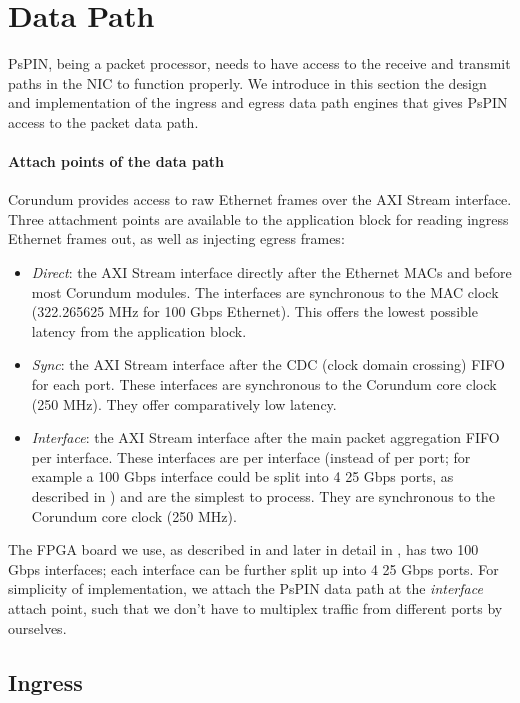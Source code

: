 \section{Data Path}

PsPIN, being a packet processor, needs to have access to the receive and transmit paths in the NIC to function properly.  We introduce in this section the design and implementation of the ingress and egress data path engines that gives PsPIN access to the packet data path.

\paragraph{Attach points of the data path} Corundum provides access to raw Ethernet frames over the AXI Stream interface.  Three attachment points are available to the application block for reading ingress Ethernet frames out, as well as injecting egress frames:

\begin{itemize}
    \item \emph{Direct}: the AXI Stream interface directly after the Ethernet MACs and before most Corundum modules.  The interfaces are synchronous to the MAC clock (322.265625 MHz for 100 Gbps Ethernet).  This offers the lowest possible latency from the application block.
    \item \emph{Sync}: the AXI Stream interface after the CDC (clock domain crossing) FIFO for each port.  These interfaces are synchronous to the Corundum core clock (250 MHz).  They offer comparatively low latency.
    \item \emph{Interface}: the AXI Stream interface after the main packet aggregation FIFO per interface.  These interfaces are per interface (instead of per port; for example a 100 Gbps interface could be split into 4 25 Gbps ports, as described in ) and are the simplest to process.  They are synchronous to the Corundum core clock (250 MHz).
\end{itemize}

The FPGA board we use, as described in  and later in detail in , has two 100 Gbps interfaces; each interface can be further split up into 4 25 Gbps ports.  For simplicity of implementation, we attach the PsPIN data path at the \emph{interface} attach point, such that we don't have to multiplex traffic from different ports by ourselves.

\subsection{Ingress} \label{sec:ingress-datapath}

